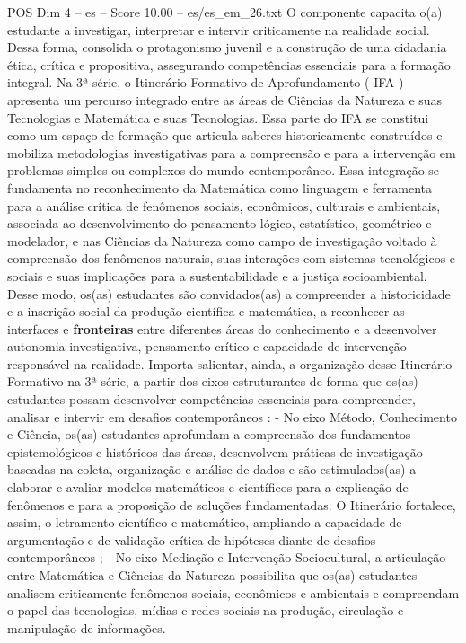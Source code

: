 \begin{textsample}{POS Dim 4 – es – Score 10.00 – es/es\_em\_26.txt}
O componente capacita o(a) estudante a investigar, interpretar e intervir criticamente na realidade social.
Dessa forma, consolida o protagonismo juvenil e a construção de uma cidadania ética, crítica e propositiva, assegurando competências essenciais para a formação integral.
Na 3ª série, o Itinerário Formativo de Aprofundamento ( IFA ) apresenta um percurso integrado entre as áreas de Ciências da Natureza e suas Tecnologias e Matemática e suas Tecnologias.
Essa parte do IFA se constitui como um espaço de formação que articula saberes historicamente construídos e mobiliza metodologias investigativas para a compreensão e para a intervenção em problemas simples ou complexos do mundo contemporâneo.
Essa integração se fundamenta no reconhecimento da Matemática como linguagem e ferramenta para a análise crítica de fenômenos sociais, econômicos, culturais e ambientais, associada ao desenvolvimento do pensamento lógico, estatístico, geométrico e modelador, e nas Ciências da Natureza como campo de investigação voltado à compreensão dos fenômenos naturais, suas interações com sistemas tecnológicos e sociais e suas implicações para a sustentabilidade e a justiça socioambiental.
Desse modo, os(as) estudantes são convidados(as) a compreender a historicidade e a inscrição social da produção científica e matemática, a reconhecer as interfaces e \textbf{fronteiras} entre diferentes áreas do conhecimento e a desenvolver autonomia investigativa, pensamento crítico e capacidade de intervenção responsável na realidade.
Importa salientar, ainda, a organização desse Itinerário Formativo na 3ª série, a partir dos eixos estruturantes de forma que os(as) estudantes possam desenvolver competências essenciais para compreender, analisar e intervir em desafios contemporâneos : - No eixo Método, Conhecimento e Ciência, os(as) estudantes aprofundam a compreensão dos fundamentos epistemológicos e históricos das áreas, desenvolvem práticas de investigação baseadas na coleta, organização e análise de dados e são estimulados(as) a elaborar e avaliar modelos matemáticos e científicos para a explicação de fenômenos e para a proposição de soluções fundamentadas.
O Itinerário fortalece, assim, o letramento científico e matemático, ampliando a capacidade de argumentação e de validação crítica de hipóteses diante de desafios contemporâneos ; - No eixo Mediação e Intervenção Sociocultural, a articulação entre Matemática e Ciências da Natureza possibilita que os(as) estudantes analisem criticamente fenômenos sociais, econômicos e ambientais e compreendam o papel das tecnologias, mídias e redes sociais na produção, circulação e manipulação de informações.

\end{textsample}
